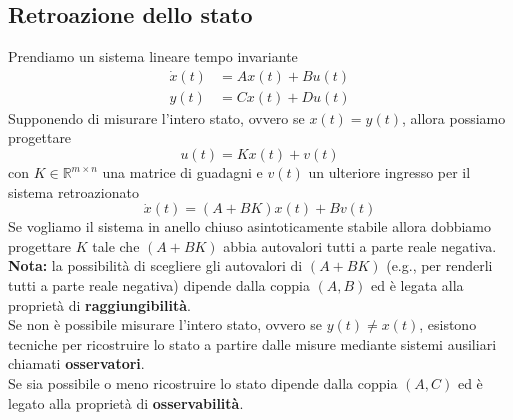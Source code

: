 \documentclass{article}
\begin{document}
\subsection{Retroazione dello stato}
Prendiamo un sistema lineare tempo invariante
\begin{align*}
    \dot x(t) &= Ax(t) + Bu(t)\\
    y(t) &= Cx(t) + Du(t) 
\end{align*}
Supponendo di misurare l'intero stato, ovvero se $x(t)=y(t)$, allora possiamo progettare
\[
    u(t) = Kx(t) + v(t)
\]
con $K \in \mathbb{R}^{m \times n}$ una matrice di guadagni e $v(t)$ un ulteriore ingresso per il sistema retroazionato
\[
    \dot x(t) = (A+BK)x(t)+Bv(t)
\]
Se vogliamo il sistema in anello chiuso asintoticamente stabile allora dobbiamo progettare $K$ tale che $(A + BK)$ abbia autovalori tutti a parte reale negativa.\\
\textbf{Nota:} la possibilità di scegliere gli autovalori di $(A + BK)$ (e.g., per renderli tutti a parte reale negativa) dipende dalla coppia $(A, B)$ ed è legata alla proprietà di \textbf{raggiungibilità}.
\vspace*{0.1cm}\\
Se non è possibile misurare l'intero stato, ovvero se $y(t) \neq x(t)$, esistono tecniche per ricostruire lo stato a partire dalle misure mediante sistemi ausiliari chiamati \textbf{osservatori}.\\
Se sia possibile o meno ricostruire lo stato dipende dalla coppia $(A, C)$ ed è legato alla proprietà di \textbf{osservabilità}.
\end{document}
